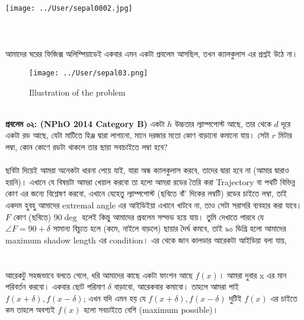 \documentclass[12pt,a4paper]{article}
\begin{document}
\texttt{[image: ../User/sepal0002.jpg]}
\\
\\
\\
\\
%
আমাদের ঘরের ফিজিক্স অলিম্পিয়াডেই একবার এমন একটা প্রবলেম আসছিল, তখন ক্যালকুলাস এর প্রশ্নই উঠে না। \\
\begin{figure}[hbtp]
\centering
\texttt{[image: ../User/sepal03.png]}
\caption{Illustration of the problem}
\end{figure}
\\
%
\textbf{প্রবলেম ০২: (NPhO 2014 Category B)} একটা $h$ উচ্চতার ল্যাম্পপোস্ট আছে, তার থেকে $d$ দূরে একটা রড আছে, যেটা মাটিতে হিঞ্জ দ্বারা লাগানো, মানে দরজার মতো কোণ বাড়ানো কমানো যায়। সেটা $r$ মিটার লম্বা, কোন কোণে রডটা থাকলে তার ছায়া সবাচাইতে লম্বা হবে? \\
\\
%
ছবিটা দিয়েই আমরা অনেকটা ধারনা পেয়ে যাই, যারা অন্ধ ক্যালকুলাস করবে, তাদের দ্বারা হবে না (আমার দ্বারাও হয়নি)। এখানে যে বিষয়টা আমরা খেয়াল করবো তা হলো আমরা রডের তৈরি করা Trajectory বা পথটি বিভিন্ন কোণ এর জন্যে বিশ্লেষণ করবো, এখানে যেহেতু ল্যাম্পপোস্ট (ছবিতে বাঁ' দিকের লম্বটি) রডের চাইতে লম্বা, তাই একদম হুবহু আমাদের extremal angle এর আইডিইয়া এখানে খাটবে না, তাও সেটা সরাসরি ব্যবহার করা যাবে। $F$ কোণ (ছবিতে) $90 \deg$ হলেই কিন্তু আমাদের প্রবলেম সল্ভড হয়ে যায়। তুমি দেখাতে পারবে যে $\angle F = 90 + \delta$ সামান্য বিচ্যুত হলে (কমে, নাইলে বাড়লে) ছায়ার দৈর্ঘ কমবে, তাই ৯০ ডিগ্রি হলো আমাদের maximum shadow length এর condition। এর থেকে জান কালডার আরেকটা আইডিয়া বলা যায়,\\
\\
\\
আরেকটু সহজভাবে বলতে গেলে, ধরি আমাদের কাছে একটা ফাংশন আছে $f(x)$। আমরা দুবার x এর মান পরিবর্তন করবো। একবার ছোট পরিমাণ $\delta$ বাড়াবো, আরেকবার কমাবো। তাহলে আমরা পাই $f(x + \delta), f(x - \delta)$; এখন যদি এমন হয় যে $f(x + \delta), f(x - \delta)$ দুটিই $f(x)$ এর চাইতে কম তাহলে অবশ্যই $f(x)$ হলো সবচাইতে বেশি (maximum possible)। \\
\end{document}
